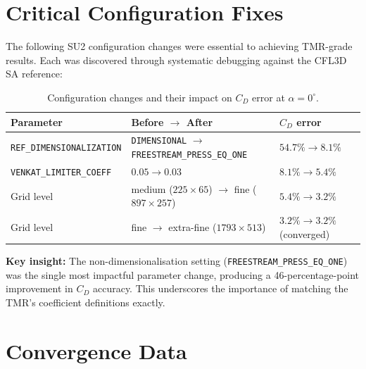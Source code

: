 \documentclass[11pt,a4paper]{article}
\begin{document}



\appendix

\section{Critical Configuration Fixes}
\label{app:config}

The following SU2 configuration changes were essential to achieving
TMR-grade results.  Each was discovered through systematic debugging
against the CFL3D SA reference:

\begin{table}[!ht]
\centering
\caption{Configuration changes and their impact on $C_D$ error at $\alpha=0^\circ$.}
\label{tab:config_fixes}
\begin{tabular}{lll}
\toprule
\textbf{Parameter} & \textbf{Before $\to$ After} & \textbf{$C_D$ error} \\
\midrule
\texttt{REF\_DIMENSIONALIZATION} &
  \texttt{DIMENSIONAL} $\to$ \texttt{FREESTREAM\_PRESS\_EQ\_ONE} &
  $54.7\% \to 8.1\%$ \\
\texttt{VENKAT\_LIMITER\_COEFF} &
  $0.05 \to 0.03$ &
  $8.1\% \to 5.4\%$ \\
Grid level &
  medium ($225\times65$) $\to$ fine ($897\times257$) &
  $5.4\% \to 3.2\%$ \\
Grid level &
  fine $\to$ extra-fine ($1793\times513$) &
  $3.2\% \to 3.2\%$ (converged) \\
\bottomrule
\end{tabular}
\end{table}

\noindent
\textbf{Key insight:} The non-dimensionalisation setting
(\texttt{FREESTREAM\_PRESS\_EQ\_ONE}) was the single most impactful
parameter change, producing a 46-percentage-point improvement in $C_D$
accuracy.  This underscores the importance of matching the TMR's
coefficient definitions exactly.

\section{Convergence Data}
\label{app:convergence}
\end{document}
